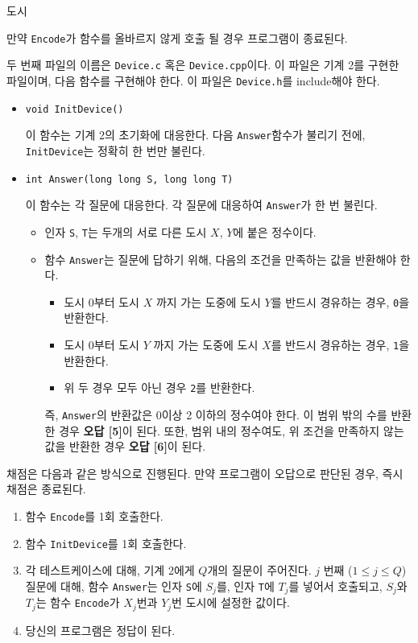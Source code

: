 \begin{problem}{도시}
\begin{itemize}
		만약 \texttt{Encode}가 함수를 올바르지 않게 호출 될 경우 프로그램이 종료된다.
		
	\end{itemize}
	
	두 번째 파일의 이름은 \texttt{Device.c} 혹은 \texttt{Device.cpp}이다. 이 파일은 기계 2를 구현한 파일이며, 다음 함수를 구현해야 한다. 이 파일은 \texttt{Device.h}를 include해야 한다.
	
	
	\begin{itemize}
		\item \texttt{void InitDevice()}
		
		이 함수는 기계 2의 초기화에 대응한다. 다음 \texttt{Answer}함수가 불리기 전에, \texttt{InitDevice}는 정확히 한 번만 불린다.
		
		\item \texttt{int Answer(long long S, long long T)}
		
		이 함수는 각 질문에 대응한다. 각 질문에 대응하여 \texttt{Answer}가 한 번 불린다.

		\begin{itemize}
			\item 인자 \texttt{S}, \texttt{T}는 두개의 서로 다른 도시 $X$, $Y$에 붙은 정수이다.
			\item 함수 \texttt{Answer}는 질문에 답하기 위해, 다음의 조건을 만족하는 값을 반환해야 한다.
			
			\begin{itemize}
				\item 도시 0부터 도시 $X$ 까지 가는 도중에 도시 $Y$를 반드시 경유하는 경우, \texttt{0}을 반환한다.
				\item 도시 0부터 도시 $Y$ 까지 가는 도중에 도시 $X$를 반드시 경유하는 경우, \texttt{1}을 반환한다.
				\item 위 두 경우 모두 아닌 경우 \texttt{2}를 반환한다.
			\end{itemize}
		
			즉, \texttt{Answer}의 반환값은 0이상 2 이하의 정수여야 한다. 이 범위 밖의 수를 반환한 경우 \textbf{오답 [5]}이 된다. 또한, 범위 내의 정수여도, 위 조건을 만족하지 않는 값을 반환한 경우 \textbf{오답 [6]}이 된다.
		
		\end{itemize}
	
	\end{itemize}
	
	채점은 다음과 같은 방식으로 진행된다. 만약 프로그램이 오답으로 판단된 경우, 즉시 채점은 종료된다.
	
	\begin{enumerate}
		\item 함수 \texttt{Encode}를 1회 호출한다.
		\item 함수 \texttt{InitDevice}를 1회 호출한다.
		\item 각 테스트케이스에 대해, 기계 2에게 $Q$개의 질문이 주어진다. $j$ 번째 ($1 \le j \le Q$) 질문에 대해, 함수 \texttt{Answer}는 인자 \texttt{S}에 $S_j$를, 인자 \texttt{T}에 $T_j$를 넣어서 호출되고, $S_j$와 $T_j$는 함수 \texttt{Encode}가 $X_j$번과 $Y_j$번 도시에 설정한 값이다.
		\item 당신의 프로그램은 정답이 된다.
	\end{enumerate}
	

\end{problem}
